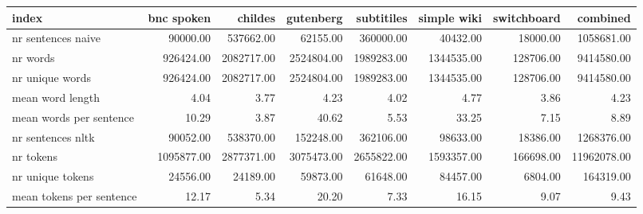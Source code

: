 \begin{tabular}{lrrrrrrr}
\toprule
index & bnc spoken & childes & gutenberg & subtitiles & simple wiki & switchboard & combined \\
\midrule
nr sentences naive & 90000.00 & 537662.00 & 62155.00 & 360000.00 & 40432.00 & 18000.00 & 1058681.00 \\
nr words & 926424.00 & 2082717.00 & 2524804.00 & 1989283.00 & 1344535.00 & 128706.00 & 9414580.00 \\
nr unique words & 926424.00 & 2082717.00 & 2524804.00 & 1989283.00 & 1344535.00 & 128706.00 & 9414580.00 \\
mean word length & 4.04 & 3.77 & 4.23 & 4.02 & 4.77 & 3.86 & 4.23 \\
mean words per sentence & 10.29 & 3.87 & 40.62 & 5.53 & 33.25 & 7.15 & 8.89 \\
nr sentences nltk & 90052.00 & 538370.00 & 152248.00 & 362106.00 & 98633.00 & 18386.00 & 1268376.00 \\
nr tokens & 1095877.00 & 2877371.00 & 3075473.00 & 2655822.00 & 1593357.00 & 166698.00 & 11962078.00 \\
nr unique tokens & 24556.00 & 24189.00 & 59873.00 & 61648.00 & 84457.00 & 6804.00 & 164319.00 \\
mean tokens per sentence & 12.17 & 5.34 & 20.20 & 7.33 & 16.15 & 9.07 & 9.43 \\
\bottomrule
\end{tabular}
